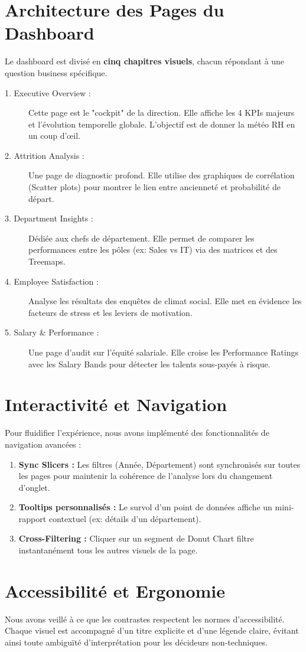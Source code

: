 \section{Architecture des Pages du Dashboard}

Le dashboard est divisé en \textbf{cinq chapitres visuels}, chacun répondant à une question business spécifique.

\begin{description}
    \item[1. Executive Overview :] Cette page est le "cockpit" de la direction. Elle affiche les 4 KPIs majeurs et l'évolution temporelle globale. L'objectif est de donner la météo RH en un coup d'œil.
    \item[2. Attrition Analysis :] Une page de diagnostic profond. Elle utilise des graphiques de corrélation (Scatter plots) pour montrer le lien entre ancienneté et probabilité de départ.
    \item[3. Department Insights :] Dédiée aux chefs de département. Elle permet de comparer les performances entre les pôles (ex: Sales vs IT) via des matrices et des Treemaps.
    \item[4. Employee Satisfaction :] Analyse les résultats des enquêtes de climat social. Elle met en évidence les facteurs de stress et les leviers de motivation.
    \item[5. Salary \& Performance :] Une page d'audit sur l'équité salariale. Elle croise les Performance Ratings avec les Salary Bands pour détecter les talents sous-payés à risque.
\end{description}

\section{Interactivité et Navigation}

Pour fluidifier l'expérience, nous avons implémenté des fonctionnalités de navigation avancées :
\begin{enumerate}
    \item \textbf{Sync Slicers :} Les filtres (Année, Département) sont synchronisés sur toutes les pages pour maintenir la cohérence de l'analyse lors du changement d'onglet.
    \item \textbf{Tooltips personnalisés :} Le survol d'un point de données affiche un mini-rapport contextuel (ex: détails d'un département).
    \item \textbf{Cross-Filtering :} Cliquer sur un segment de Donut Chart filtre instantanément tous les autres visuels de la page.
\end{enumerate}

\section{Accessibilité et Ergonomie}

Nous avons veillé à ce que les contrastes respectent les normes d'accessibilité. Chaque visuel est accompagné d'un titre explicite et d'une légende claire, évitant ainsi toute ambiguïté d'interprétation pour les décideurs non-techniques.
